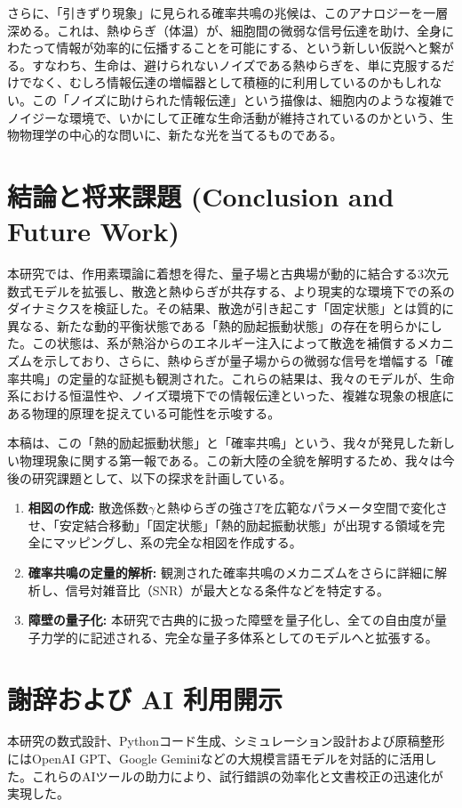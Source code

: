 \documentclass[a4paper,11pt,ja=standard,lualatex]{bxjsarticle}
\begin{document}
さらに、「引きずり現象」に見られる確率共鳴の兆候は、このアナロジーを一層深める。これは、熱ゆらぎ（体温）が、細胞間の微弱な信号伝達を助け、全身にわたって情報が効率的に伝播することを可能にする、という新しい仮説へと繋がる。すなわち、生命は、避けられないノイズである熱ゆらぎを、単に克服するだけでなく、むしろ情報伝達の増幅器として積極的に利用しているのかもしれない。この「ノイズに助けられた情報伝達」という描像は、細胞内のような複雑でノイジーな環境で、いかにして正確な生命活動が維持されているのかという、生物物理学の中心的な問いに、新たな光を当てるものである。

\FloatBarrier
\section{結論と将来課題 (Conclusion and Future Work)}
本研究では、作用素環論に着想を得た、量子場と古典場が動的に結合する3次元数式モデルを拡張し、散逸と熱ゆらぎが共存する、より現実的な環境下での系のダイナミクスを検証した。その結果、散逸が引き起こす「固定状態」とは質的に異なる、新たな動的平衡状態である「熱的励起振動状態」の存在を明らかにした。この状態は、系が熱浴からのエネルギー注入によって散逸を補償するメカニズムを示しており、さらに、熱ゆらぎが量子場からの微弱な信号を増幅する「確率共鳴」の定量的な証拠も観測された。これらの結果は、我々のモデルが、生命系における恒温性や、ノイズ環境下での情報伝達といった、複雑な現象の根底にある物理的原理を捉えている可能性を示唆する。

本稿は、この「熱的励起振動状態」と「確率共鳴」という、我々が発見した新しい物理現象に関する第一報である。この新大陸の全貌を解明するため、我々は今後の研究課題として、以下の探求を計画している。
\begin{enumerate}
    \item \textbf{相図の作成:} 散逸係数$\gamma$と熱ゆらぎの強さ$T$を広範なパラメータ空間で変化させ、「安定結合移動」「固定状態」「熱的励起振動状態」が出現する領域を完全にマッピングし、系の完全な相図を作成する。
    \item \textbf{確率共鳴の定量的解析:} 観測された確率共鳴のメカニズムをさらに詳細に解析し、信号対雑音比（SNR）が最大となる条件などを特定する。
    \item \textbf{障壁の量子化:} 本研究で古典的に扱った障壁を量子化し、全ての自由度が量子力学的に記述される、完全な量子多体系としてのモデルへと拡張する。
\end{enumerate}

\section*{謝辞および AI 利用開示}
本研究の数式設計、Pythonコード生成、シミュレーション設計および原稿整形にはOpenAI GPT、Google Geminiなどの大規模言語モデルを対話的に活用した。これらのAIツールの助力により、試行錯誤の効率化と文書校正の迅速化が実現した。
\end{document}
